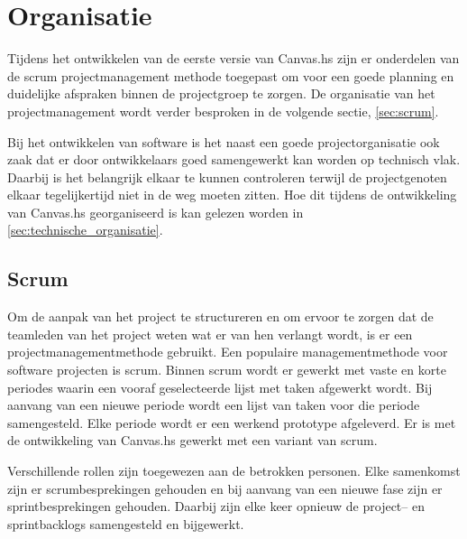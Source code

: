 \chapter{Organisatie} \label{hoofdstuk:organisatie}
Tijdens het ontwikkelen van de eerste versie van Canvas.hs zijn er onderdelen van de scrum projectmanagement methode toegepast om voor een goede planning en duidelijke afspraken binnen de projectgroep te zorgen. De organisatie van het projectmanagement wordt verder besproken in de volgende sectie, \autoref{sec:scrum}.

Bij het ontwikkelen van software is het naast een goede projectorganisatie ook zaak dat er door ontwikkelaars goed samengewerkt kan worden op technisch vlak. Daarbij is het belangrijk elkaar te kunnen controleren terwijl de projectgenoten elkaar tegelijkertijd niet in de weg moeten zitten. Hoe dit tijdens de ontwikkeling van Canvas.hs georganiseerd is kan gelezen worden in \autoref{sec:technische_organisatie}.

\section{Scrum} \label{sec:scrum}
Om de aanpak van het project te structureren en om ervoor te zorgen dat de teamleden van het project weten wat er van hen verlangt wordt, is er een projectmanagementmethode gebruikt. Een populaire managementmethode voor software projecten is scrum. Binnen scrum wordt er gewerkt met vaste en korte periodes waarin een vooraf geselecteerde lijst met taken afgewerkt wordt. Bij aanvang van een nieuwe periode wordt een lijst van taken voor die periode samengesteld. Elke periode wordt er een werkend prototype afgeleverd. Er is met de ontwikkeling van Canvas.hs gewerkt met een variant van scrum.

Verschillende rollen zijn toegewezen aan de betrokken personen. Elke samenkomst zijn er scrumbesprekingen gehouden en bij aanvang van een nieuwe fase zijn er sprintbesprekingen gehouden. Daarbij zijn elke keer opnieuw de project– en sprintbacklogs samengesteld en bijgewerkt.

